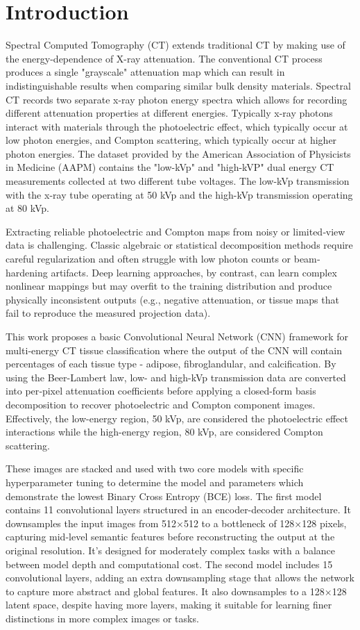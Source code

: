 \section{Introduction}\label{sec:introduction}

Spectral Computed Tomography (CT) extends traditional CT by making use of the energy-dependence of
X-ray attenuation. The conventional CT process produces a single "grayscale" attenuation map which
can result in indistinguishable results when comparing similar bulk density materials. Spectral CT records
two separate x-ray photon energy spectra which allows for recording different attenuation properties
at different energies. Typically x-ray photons interact with materials through the photoelectric effect,
which typically occur at low photon energies, and Compton scattering, which typically occur at higher
photon energies. The dataset provided by the American Association of Physicists in Medicine (AAPM)
contains the "low-kVp" and "high-kVP" dual energy CT measurements collected at two different tube
voltages. The low-kVp transmission with the x-ray tube operating at 50 kVp and the high-kVp transmission 
operating at 80 kVp.

Extracting reliable photoelectric and Compton maps from noisy or limited‐view data is challenging. Classic
algebraic or statistical decomposition methods require careful regularization and often struggle with low
photon counts or beam‐hardening artifacts. Deep learning approaches, by contrast, can learn complex nonlinear
mappings but may overfit to the training distribution and produce physically inconsistent outputs (e.g.,
negative attenuation, or tissue maps that fail to reproduce the measured projection data).

This work proposes a basic Convolutional Neural Network (CNN) framework for multi‐energy CT tissue classification
where the output of the CNN will contain percentages of each tissue type - adipose, fibroglandular, and calcification.
By using the Beer-Lambert law, low- and high-kVp transmission data are converted into per‐pixel attenuation coefficients
before applying a closed-form basis decomposition to recover photoelectric and Compton component images. Effectively,
the low-energy region, 50 kVp, are considered the photoelectric effect interactions while the high-energy region, 80 kVp, 
are considered Compton scattering. 

These images are stacked and used with two core models with specific hyperparameter tuning to determine the model and
parameters which demonstrate the lowest Binary Cross Entropy (BCE) loss. The first model contains 11 convolutional layers 
structured in an encoder-decoder architecture. It downsamples the input images from 512×512 to a bottleneck of 128×128 
pixels, capturing mid-level semantic features before reconstructing the output at the original resolution. It's designed 
for moderately complex tasks with a balance between model depth and computational cost. The second model includes 15 
convolutional layers, adding an extra downsampling stage that allows the network to capture more abstract and global 
features. It also downsamples to a 128×128 latent space, despite having more layers, making it suitable for learning 
finer distinctions in more complex images or tasks.

